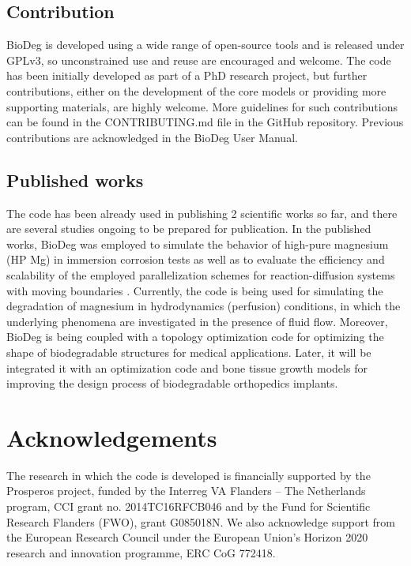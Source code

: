 \subsection{Contribution}

BioDeg is developed using a wide range of open-source tools and is released under GPLv3, so unconstrained use and reuse are encouraged and welcome. The code has been initially developed as part of a PhD research project, but further contributions, either on the development of the core models or providing more supporting materials, are highly welcome. More guidelines for such contributions can be found in the CONTRIBUTING.md file in the GitHub repository. Previous contributions are acknowledged in the BioDeg User Manual.

\subsection{Published works}

The code has been already used in publishing 2 scientific works so far, and there are several studies ongoing to be prepared for publication. In the published works, BioDeg was employed to simulate the behavior of high-pure magnesium (HP Mg) in immersion corrosion tests \cite{Barzegari2021} as well as to evaluate the efficiency and scalability of the employed parallelization schemes for reaction-diffusion systems with moving boundaries \cite{Barzegari2022}. Currently, the code is being used for simulating the degradation of magnesium in hydrodynamics (perfusion) conditions, in which the underlying phenomena are investigated in the presence of fluid flow. Moreover, BioDeg is being coupled with a topology optimization code for optimizing the shape of biodegradable structures for medical applications. Later, it will be integrated it with an optimization code and bone tissue growth models for improving the design process of biodegradable orthopedics implants.

\section*{Acknowledgements}

The research in which the code is developed is financially supported by the Prosperos project, funded by the Interreg VA Flanders – The Netherlands program, CCI grant no. 2014TC16RFCB046 and by the Fund for Scientific Research Flanders (FWO), grant G085018N. We also acknowledge support from the European Research Council under the European Union's Horizon 2020 research and innovation programme, ERC CoG 772418.




\cleardoublepage
